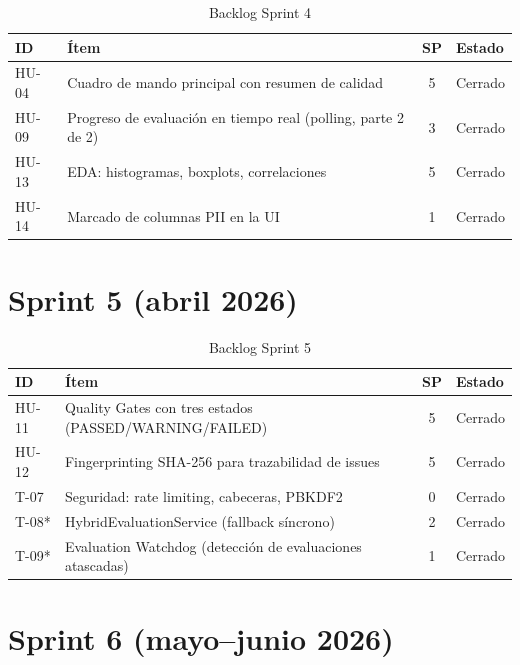 \begin{table}[H]
  \centering
  \small
  \caption{Backlog Sprint 4}
  \begin{tabularx}{\textwidth}{l X c l}
    \toprule
    \textbf{ID} & \textbf{Ítem} & \textbf{SP} & \textbf{Estado} \\
    \midrule
    HU-04 & Cuadro de mando principal con resumen de calidad & 5 & Cerrado \\
    HU-09 & Progreso de evaluación en tiempo real (polling, parte 2 de 2) & 3 & Cerrado \\
    HU-13 & \ac{EDA}: histogramas, boxplots, correlaciones & 5 & Cerrado \\
    HU-14 & Marcado de columnas \ac{PII} en la \ac{UI} & 1 & Cerrado \\
    \bottomrule
  \end{tabularx}
\end{table}

\section*{Sprint 5 (abril 2026)}

\begin{table}[H]
  \centering
  \small
  \caption{Backlog Sprint 5}
  \begin{tabularx}{\textwidth}{l X c l}
    \toprule
    \textbf{ID} & \textbf{Ítem} & \textbf{SP} & \textbf{Estado} \\
    \midrule
    HU-11 & Quality Gates con tres estados (PASSED/WARNING/FAILED) & 5 & Cerrado \\
    HU-12 & Fingerprinting SHA-256 para trazabilidad de issues & 5 & Cerrado \\
    T-07  & Seguridad: rate limiting, cabeceras, PBKDF2 & 0 & Cerrado \\
    T-08* & HybridEvaluationService (fallback síncrono) & 2 & Cerrado \\
    T-09* & Evaluation Watchdog (detección de evaluaciones atascadas) & 1 & Cerrado \\
    \bottomrule
  \end{tabularx}
\end{table}

\section*{Sprint 6 (mayo--junio 2026)}

